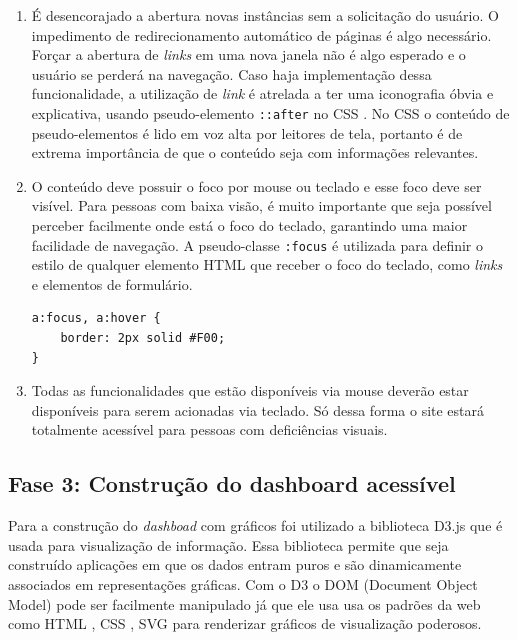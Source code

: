 {{{{\begin{enumerate}
{\begin{lstlisting}[language=html,caption=separando \textit{links} adjacentes]
<ul id="menu">
    <li> <a href="home.html">Home</a></li>
    <li> <a href="pesquisa.html">Pesquisa</a></li>
</ul>
\end{lstlisting}}
    \item É desencorajado a abertura novas instâncias sem a solicitação do usuário. O impedimento de  redirecionamento automático de páginas é algo necessário. Forçar a abertura de \textit{links} em uma nova janela não é algo esperado e o usuário se perderá na navegação. Caso haja implementação dessa funcionalidade, a utilização de \textit{link} é atrelada a ter uma iconografia óbvia e explicativa, usando pseudo-elemento \lstinline{::after} no CSS \cite{CSS}. No CSS \cite{CSS} o conteúdo de pseudo-elementos é lido em voz alta por leitores de tela, portanto é de extrema importância de que o conteúdo seja com informações relevantes.
    \item O conteúdo deve possuir o foco por mouse ou teclado e esse foco deve ser visível. Para pessoas com baixa visão, é muito importante que seja possível perceber facilmente onde está o foco do teclado, garantindo uma maior facilidade de navegação. A pseudo-classe \lstinline{:focus} é utilizada para definir o estilo de qualquer elemento HTML \cite{HTML} que receber o foco do teclado, como \textit{links} e elementos de formulário.
{\begin{lstlisting}[language=html,caption=usando o foco visível]
a:focus, a:hover {
    border: 2px solid #F00;
}
\end{lstlisting}}
    \item Todas as funcionalidades que estão disponíveis via mouse deverão estar disponíveis para serem acionadas via teclado. Só dessa forma o site estará totalmente acessível para pessoas com deficiências visuais. 
\end{enumerate}
}
}
}


\subsection{Fase 3: Construção do dashboard acessível}
{Para a construção do \textit{dashboad} com gráficos foi utilizado a biblioteca D3.js \cite{D3} que é usada para visualização de informação. Essa biblioteca permite que seja construído aplicações em que os dados entram puros e são dinamicamente associados em representações gráficas. Com o D3 o DOM \cite{DOM} (Document Object Model)  pode ser facilmente manipulado já que ele usa usa os padrões da web como HTML \cite{HTML}, CSS \cite{CSS}, SVG para renderizar gráficos de visualização poderosos.

}}

